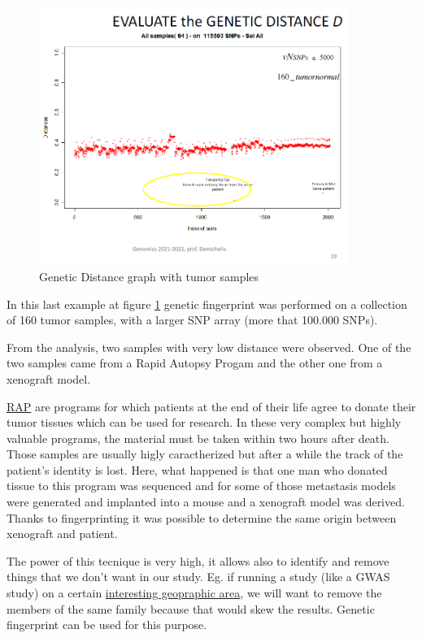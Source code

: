 \begin{figure}[h]
	\centering
	\includegraphics[width=0.9\textwidth]{Distance3.PNG}
	\caption{\label{fig:Distance3}Genetic Distance graph with tumor samples}
\end{figure}

\bigskip
In this last example at figure \ref{fig:Distance3} genetic fingerprint was
performed on a collection of 160  tumor samples, with a larger SNP array (more
that 100.000 SNPs).  

From the analysis, two samples with very low distance were observed. One of the
two samples came from a Rapid Autopsy Progam and the other one from a xenograft
model. 

\underline{RAP} are programs for which patients at the end of their life agree
to donate their tumor tissues which can be used for research. In these very
complex but highly valuable programs, the material must be taken within two
hours after death. Those samples are usually higly caractherized but after a
while the track of the patient's identity is lost. Here, what happened is that
one man who donated tissue to this program was sequenced and for some of those
metastasis models were generated and implanted into a mouse and a xenograft
model was derived. Thanks to fingerprinting it was possible to determine the
same origin between xenograft and patient. 

The power of this tecnique is very high, it allows also to identify and remove
things that we don't want in our study. Eg. if running a study (like a GWAS
study) on a certain \underline{interesting geopraphic area}, we will want to
remove the members of the same family because that would skew the results.
Genetic fingerprint can be used for this purpose.

